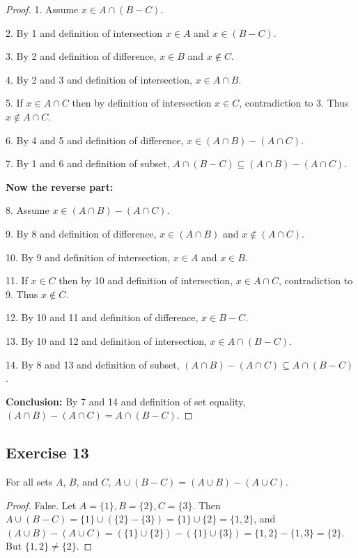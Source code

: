 \documentclass[14pt]{extarticle}
\begin{document}
\begin{proof}
1. Assume \(x \in A \cap (B - C)\).

2. By 1 and definition of intersection \(x \in A\) and \(x \in (B - C)\).

3. By 2 and definition of difference, \(x \in B\) and \(x \notin C\).

4. By 2 and 3 and definition of intersection, \(x \in A \cap B\).

5. If \(x \in A \cap C\) then by definition of intersection \(x \in C\), contradiction to 3. Thus \(x \notin A \cap C\). 

6. By 4 and 5 and definition of difference, \(x \in (A \cap B) - (A \cap C)\).

7. By 1 and 6 and definition of subset, \(A \cap (B - C) \subseteq (A \cap B) - (A \cap C)\).

{\bf Now the reverse part:}

8. Assume \(x \in (A \cap B) - (A \cap C)\).

9. By 8 and definition of difference, \(x \in (A \cap B)\) and \(x \notin (A \cap C)\).

10. By 9 and definition of intersection, \(x \in A\) and \(x \in B\).

11. If \(x \in C\) then by 10 and definition of intersection, \(x \in A \cap C\), contradiction to 9. 
Thus \(x \notin C\).

12. By 10 and 11 and definition of difference, \(x \in B - C\).

13. By 10 and 12 and definition of intersection, \(x \in A \cap (B - C)\).

14. By 8 and 13 and definition of subset, \((A \cap B) - (A \cap C) \subseteq A \cap (B - C)\).

{\bf Conclusion:} By 7 and 14 and definition of set equality, \((A \cap B) - (A \cap C) = A \cap (B - C)\).
\end{proof}

\subsection{Exercise 13}
For all sets $A$, $B$, and $C$, \(A \cup (B - C) = (A \cup B) - (A \cup C)\).

\begin{proof}
False. Let \(A = \{1\}, B = \{2\}, C = \{3\}\). Then \(A \cup (B - C) = \{1\} \cup (\{2\} - \{3\}) = \{1\} \cup 
\{2\} = \{1, 2\}\), and \((A \cup B) - (A \cup C) = (\{1\} \cup \{2\}) - (\{1\} \cup \{3\}) = \{1, 2\} - \{1, 3\} = 
\{2\}\). But \(\{1, 2\} \neq \{2\}\).
\end{proof}
\end{document}

